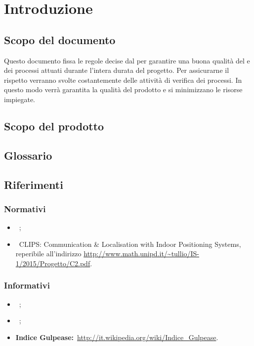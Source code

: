 
\section{Introduzione}
	\subsection{Scopo del documento}
	Questo documento fissa le regole decise dal  per garantire una buona qualità del  e dei processi attuati durante l'intera durata del progetto. Per assicurarne il rispetto verranno svolte costantemente delle attività di verifica dei processi. In questo modo verrà garantita la qualità del prodotto e si minimizzano le risorse impiegate.
	
	\subsection{Scopo del prodotto}
	\SCOPO
	
	\subsection{Glossario}
	\GLOSSARIO
	
	\subsection{Riferimenti} 
	\subsubsection{Normativi}
	\begin{itemize}
		\item {}\ \NPdoc;
		\item {}\ CLIPS: Communication \& Localisation with Indoor Positioning Systems, reperibile all'indirizzo \url{http://www.math.unipd.it/~tullio/IS-1/2015/Progetto/C2.pdf}.
	\end{itemize}
	
	\subsubsection{Informativi}
	\begin{itemize}
		\item {}\ \ARdoc;
		\item {}\ \PPdoc;
		\item \textbf{Indice Gulpease:}\ \url{http://it.wikipedia.org/wiki/Indice_Gulpease}.
	\end{itemize}
	


			
			